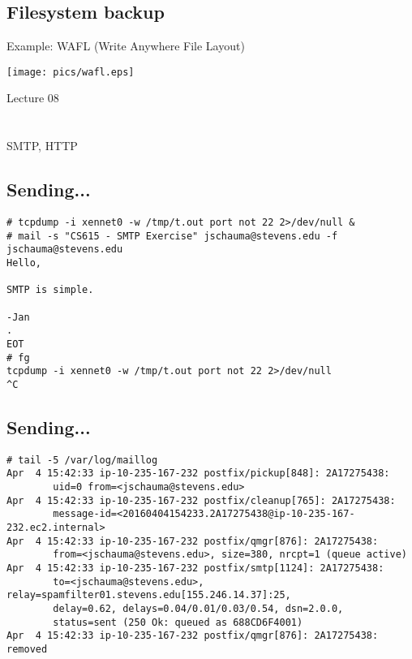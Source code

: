 \documentclass[xga]{xdvislides}
\begin{document}
\subsection{Filesystem backup}
Example: WAFL (Write Anywhere File Layout)
\vspace*{\fill}
\begin{center}
	\texttt{[image: pics/wafl.eps]}
\end{center}
\vspace*{\fill}

\newpage
\vspace*{\fill}
\begin{center}
    \Hugesize
        Lecture 08 \\ [1em]
    \hspace*{5mm}
    \blueline\\
    \hspace*{5mm}\\
	SMTP, HTTP
\end{center}
\vspace*{\fill}

\subsection{Sending...}
\begin{verbatim}
# tcpdump -i xennet0 -w /tmp/t.out port not 22 2>/dev/null &
# mail -s "CS615 - SMTP Exercise" jschauma@stevens.edu -f jschauma@stevens.edu
Hello,

SMTP is simple.

-Jan
.
EOT
# fg
tcpdump -i xennet0 -w /tmp/t.out port not 22 2>/dev/null
^C
\end{verbatim}

\subsection{Sending...}
\begin{verbatim}
# tail -5 /var/log/maillog
Apr  4 15:42:33 ip-10-235-167-232 postfix/pickup[848]: 2A17275438:
        uid=0 from=<jschauma@stevens.edu>
Apr  4 15:42:33 ip-10-235-167-232 postfix/cleanup[765]: 2A17275438:
        message-id=<20160404154233.2A17275438@ip-10-235-167-232.ec2.internal>
Apr  4 15:42:33 ip-10-235-167-232 postfix/qmgr[876]: 2A17275438:
        from=<jschauma@stevens.edu>, size=380, nrcpt=1 (queue active)
Apr  4 15:42:33 ip-10-235-167-232 postfix/smtp[1124]: 2A17275438:
        to=<jschauma@stevens.edu>, relay=spamfilter01.stevens.edu[155.246.14.37]:25,
        delay=0.62, delays=0.04/0.01/0.03/0.54, dsn=2.0.0,
        status=sent (250 Ok: queued as 688CD6F4001)
Apr  4 15:42:33 ip-10-235-167-232 postfix/qmgr[876]: 2A17275438: removed
\end{verbatim}
\end{document}

